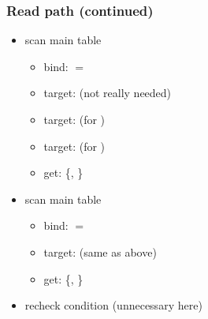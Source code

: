 \begin{frame}
  \frametitle{Read path (continued)}
  \begin{itemize}
    \item scan main table
      \begin{itemize}
        \item bind:  $=$ 
          \pause
        \item target:  (not really needed)
        \item target:  (for )
        \item target:  (for )
          \pause
        \item get: \{, \}
      \end{itemize}
      \pause
    \item scan main table
      \begin{itemize}
        \item bind:  $=$ 
          \pause
        \item target: (same as above)
          \pause
        \item get: \{, \}
      \end{itemize}
      \pause
    \item recheck condition (unnecessary here)
  \end{itemize}
\end{frame}

